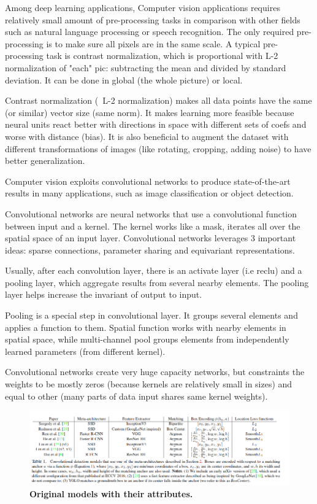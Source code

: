 \documentclass[conference]{IEEEtran}
\begin{document}
Among deep learning applications, Computer vision applications requires relatively small amount of pre-processing tasks in comparison with other fields such as natural language processing or speech recognition. The only required pre-processing is to make sure all pixels are in the same scale. A typical pre-processing task is contrast normalization, which is proportional with L-2 normalization of "each" pic: subtracting the mean and divided by standard deviation. It can be done in global (the whole picture) or local. 

Contrast normalization (~L-2 normalization) makes all data points have the same (or similar) vector size (same norm). It makes learning more feasible because neural units react better with directions in space with different sets of coefs and worse with distance (bias). It is also beneficial to augment the dataset with different transformations of images (like rotating, cropping, adding noise) to have better generalization.

Computer vision exploits convolutional networks to produce state-of-the-art results in many applications, such as image classification or object detection.

Convolutional networks are neural networks that use a convolutional function between input and a kernel. The kernel works like a mask, iterates all over the spatial space of an input layer. Convolutional networks leverages 3 important ideas: sparse connections, parameter sharing and equivariant representations.

Usually, after each convolution layer, there is an activate layer (i.e reclu) and a pooling layer, which aggregate results from several nearby elements. The pooling layer helps increase the invariant of output to input.

Pooling is a special step in convolutional layer. It groups several elements and applies a function to them. Spatial function works with nearby elements in spatial space, while multi-channel pool groups elements from independently learned parameters (from different kernel).

Convolutional networks create very huge capacity networks, but constraints the weights to be mostly zeros (because kernels are relatively small in sizes) and equal to other (many parts of data input shares same kernel weights).

\begin{figure}[htpb]
	  \centering
	  \includegraphics[width=\textwidth]{original_models}
	  \caption{\textbf{Original models with their attributes.}}
	  \label{fig:original_models}
\end{figure}
\end{document}
